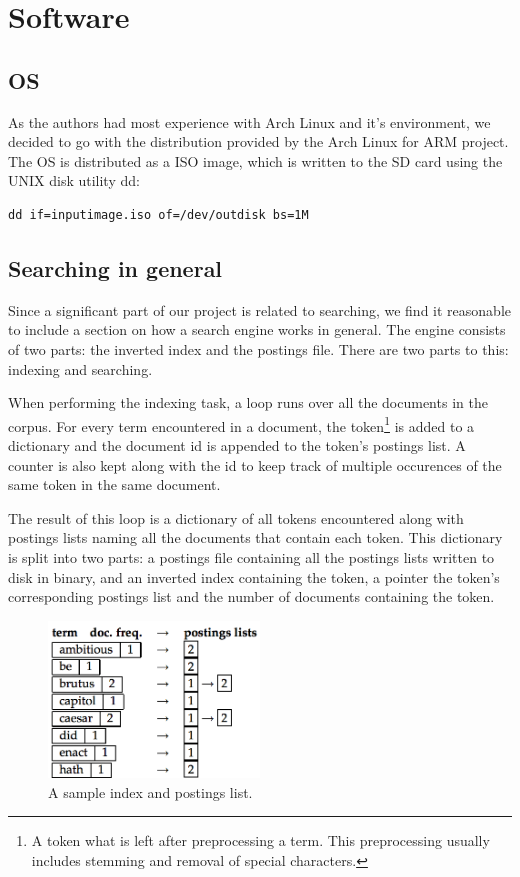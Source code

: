 \clearpage
\section{Software}
\subsection{OS}
As the authors had most experience with Arch Linux and it's environment, we decided to go with the distribution provided by the Arch Linux for ARM project.
The OS is distributed as a ISO image, which is written to the SD card using the UNIX disk utility dd:
\begin{lstlisting}
dd if=inputimage.iso of=/dev/outdisk bs=1M
\end{lstlisting}

\subsection{Searching in general}
Since a significant part of our project is related to searching, we find it reasonable to include a section on how a search engine works in general. The engine consists of two parts: the inverted index and the postings file. There are two parts to this: indexing and searching.\cite{IntroIR}

When performing the indexing task, a loop runs over all the documents in the corpus. For every term encountered in a document, the token\footnote{A token what is left after preprocessing a term. This preprocessing usually includes stemming and removal of special characters.} is added to a dictionary and the document id is appended to the token's postings list. A counter is also kept along with the id to keep track of multiple occurences of the same token in the same document.

The result of this loop is a dictionary of all tokens encountered along with postings lists naming all the documents that contain each token. This dictionary is split into two parts: a postings file containing all the  postings lists written to disk in binary, and an inverted index containing the token, a pointer the token's corresponding postings list and the number of documents containing the token.

\begin{figure}[h]
    \includegraphics[width=0.5\textwidth]{software/index_postings_lists}
    \caption{A sample index and postings list.\cite{IntroIR}}
    \label{fig:index_postings_lists_sw}
\end{figure}

